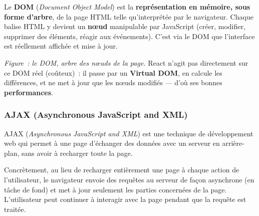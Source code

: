 \noindent Le \textbf{DOM} (\textit{Document Object Model}) est la \textbf{représentation en mémoire, sous forme d'arbre}, de la page HTML telle qu'interprétée par le navigateur. Chaque balise HTML y devient un \textbf{n\oe ud} manipulable par JavaScript (créer, modifier, supprimer des éléments, réagir aux événements). C'est via le DOM que l'interface est réellement affichée et mise à jour.
\vspace{0.5cm}
\begin{center}
\end{center}
\vspace{0.5cm}

\noindent\textit{Figure~: le DOM, arbre des n\oe uds de la page.} React n'agit pas directement sur ce DOM réel (coûteux)~: il passe par un \textbf{Virtual DOM}, en calcule les différences, et ne met à jour que les n\oe uds modifiés — d'où ses bonnes \textbf{performances}.

\vspace{0.5cm}

\subsubsection*{AJAX (Asynchronous JavaScript and XML)}

\noindent AJAX (\textit{Asynchronous JavaScript and XML}) est une technique de développement web qui permet à une page d'échanger des données avec un serveur en arrière-plan, sans avoir à recharger toute la page.

\noindent Concrètement, au lieu de recharger entièrement une page à chaque action de l'utilisateur, le navigateur envoie des requêtes au serveur de façon asynchrone (en tâche de fond) et met à jour seulement les parties concernées de la page. L'utilisateur peut continuer à interagir avec la page pendant que la requête est traitée.

